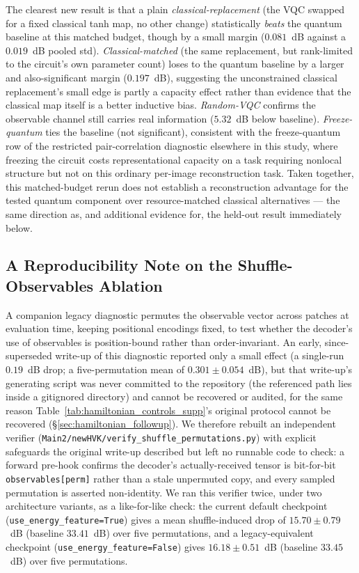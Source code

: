 \documentclass[11pt]{article}
\begin{document}
The clearest new result is that a plain \emph{classical-replacement} (the VQC swapped for a fixed classical tanh map, no other change) statistically \emph{beats} the quantum baseline at this matched budget, though by a small margin ($0.081$~dB against a $0.019$~dB pooled std). \emph{Classical-matched} (the same replacement, but rank-limited to the circuit's own parameter count) loses to the quantum baseline by a larger and also-significant margin ($0.197$~dB), suggesting the unconstrained classical replacement's small edge is partly a capacity effect rather than evidence that the classical map itself is a better inductive bias. \emph{Random-VQC} confirms the observable channel still carries real information ($5.32$~dB below baseline). \emph{Freeze-quantum} ties the baseline (not significant), consistent with the freeze-quantum row of the restricted pair-correlation diagnostic elsewhere in this study, where freezing the circuit costs representational capacity on a task requiring nonlocal structure but not on this ordinary per-image reconstruction task. Taken together, this matched-budget rerun does not establish a reconstruction advantage for the tested quantum component over resource-matched classical alternatives --- the same direction as, and additional evidence for, the held-out result immediately below.

\subsection{A Reproducibility Note on the Shuffle-Observables Ablation}
\label{sec:shuffle_reproducibility}
A companion legacy diagnostic permutes the observable vector across patches at evaluation time, keeping positional encodings fixed, to test whether the decoder's use of observables is position-bound rather than order-invariant. An early, since-superseded write-up of this diagnostic reported only a small effect (a single-run $0.19$~dB drop; a five-permutation mean of $0.301\pm0.054$~dB), but that write-up's generating script was never committed to the repository (the referenced path lies inside a gitignored directory) and cannot be recovered or audited, for the same reason Table~\ref{tab:hamiltonian_controls_supp}'s original protocol cannot be recovered (\S\ref{sec:hamiltonian_followup}). We therefore rebuilt an independent verifier (\texttt{Main2/newHVK/verify\_shuffle\_permutations.py}) with explicit safeguards the original write-up described but left no runnable code to check: a forward pre-hook confirms the decoder's actually-received tensor is bit-for-bit \texttt{observables[perm]} rather than a stale unpermuted copy, and every sampled permutation is asserted non-identity. We ran this verifier twice, under two architecture variants, as a like-for-like check: the current default checkpoint (\texttt{use\_energy\_feature=True}) gives a mean shuffle-induced drop of $15.70\pm0.79$~dB (baseline $33.41$~dB) over five permutations, and a legacy-equivalent checkpoint (\texttt{use\_energy\_feature=False}) gives $16.18\pm0.51$~dB (baseline $33.45$~dB) over five permutations.
\end{document}
